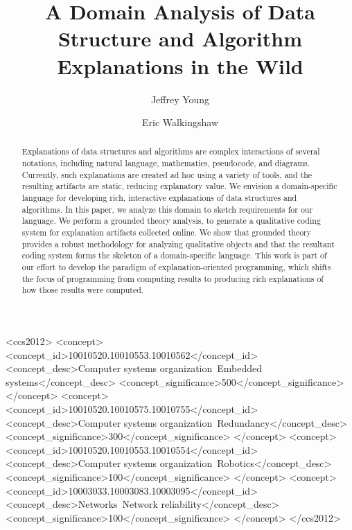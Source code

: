 \documentclass[sigconf]{acmart}
\begin{document}
\title{A Domain Analysis of Data Structure and Algorithm Explanations in the Wild}


\author{Jeffrey Young} 
\author{Eric Walkingshaw} 


\begin{abstract}
  Explanations of data structures and algorithms are complex interactions of
  several notations, including natural language, mathematics, pseudocode, and
  diagrams. Currently, such explanations are created ad hoc using a variety of
  tools, and the resulting artifacts are static, reducing explanatory value. We
  envision a domain-specific language for developing rich, interactive
  explanations of data structures and algorithms. In this paper, we analyze this
  domain to sketch requirements for our language. We perform a grounded theory
  analysis, to generate a qualitative coding system for explanation artifacts
  collected online. We show that grounded theory provides a robust methodology
  for analyzing qualitative objects and that the resultant coding system forms
  the skeleton of a domain-specific language. This work is part of our effort to
  develop the paradigm of explanation-oriented programming, which shifts the
  focus of programming from computing results to producing rich explanations of
  how those results were computed.
\end{abstract}

%
%
\begin{CCSXML}
<ccs2012>
 <concept>
  <concept_id>10010520.10010553.10010562</concept_id>
  <concept_desc>Computer systems organization~Embedded systems</concept_desc>
  <concept_significance>500</concept_significance>
 </concept>
 <concept>
  <concept_id>10010520.10010575.10010755</concept_id>
  <concept_desc>Computer systems organization~Redundancy</concept_desc>
  <concept_significance>300</concept_significance>
 </concept>
 <concept>
  <concept_id>10010520.10010553.10010554</concept_id>
  <concept_desc>Computer systems organization~Robotics</concept_desc>
  <concept_significance>100</concept_significance>
 </concept>
 <concept>
  <concept_id>10003033.10003083.10003095</concept_id>
  <concept_desc>Networks~Network reliability</concept_desc>
  <concept_significance>100</concept_significance>
 </concept>
</ccs2012>  
\end{CCSXML}
\end{document}
